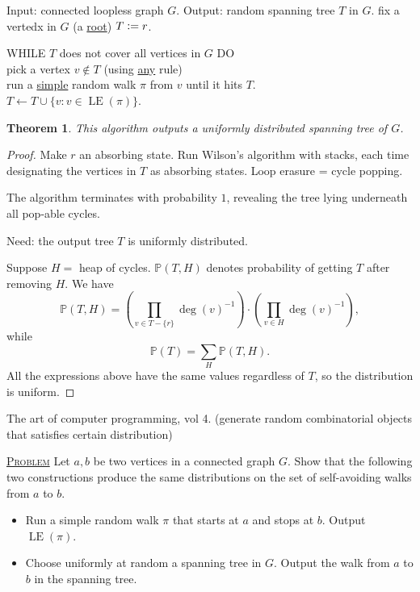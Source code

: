 \documentclass{report}
\newcommand{\matP}{\mathbb{P}}
\def \LE {\operatorname{LE}}
\newcommand{\defeq}{\vcentcolon=}
\newcommand{\fancyem}[1]{\underline{\textsc{#1}}}
\newtheorem{theorem}{Theorem}[section]
\theoremstyle{definition}
\theoremstyle{remark}
\numberwithin{equation}{section}
\begin{document}
Input: connected loopless graph $G$.
Output: random spanning tree $T$ in $G$.
fix a vertedx in $G$ (a \underline{root}) $T \defeq {r}$.

WHILE $T$ does not cover all vertices in $G$ DO \\
    pick a vertex $v \notin T$  (using \underline{any} rule) \\
    run a \underline{simple} random walk $\pi$ from $v$ until it hits $T$.\\
    $T \leftarrow T \cup \{v: v \in \LE(\pi)\}$.

\begin{theorem}
    This algorithm outputs a uniformly distributed spanning tree of $G$.
\end{theorem}
\begin{proof}
    Make $r$ an absorbing state. Run Wilson's algorithm with stacks, each time designating the vertices in $T$ as absorbing states. Loop erasure = cycle popping.

    The algorithm terminates with probability $1$, revealing the tree lying underneath all pop-able cycles. 

    Need: the output tree $T$ is uniformly distributed.

    Suppose $H = $ heap of cycles. $\matP(T, H)$ denotes probability of getting $T$ after removing $H$. We have 
    \[
        \matP(T, H) = \left(\prod_{v \in T - \{r\}} \deg(v)^{-1}\right)\cdot\left(\prod_{v \in H}\deg(v)^{-1}\right),
    \]
    while \[
        \matP(T) = \sum_{H} \matP(T, H).
    \]
    All the expressions above have the same values regardless of $T$, so the distribution is uniform.
\end{proof}

The art of computer programming, vol 4. (generate random combinatorial objects that satisfies certain distribution)

\fancyem{Problem} Let $a, b$ be two vertices in a connected graph $G$. Show that the following two constructions produce the same distributions on the set of self-avoiding walks from $a$ to $b$.
\begin{itemize}
    \item Run a simple random walk $\pi$ that starts at $a$ and stops at $b$. Output $\LE(\pi)$.
    \item Choose uniformly at random a spanning tree in $G$. Output the walk from $a$ to $b$ in the spanning tree.
\end{itemize}
\end{document}
